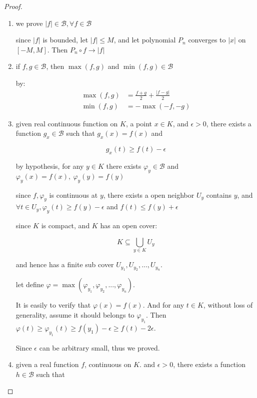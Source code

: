 \begin{proof}
    \begin{enumerate}
        \item we prove $|f| \in \mathscr{B}, \forall f \in \mathscr{B}$

        since $|f|$ is bounded, let $|f| \le M$, and let polynomial $P_n$ converges to 
        $|x|$ on $[-M, M]$. Then $P_n \circ f \to |f|$ 

        \item if $f,g \in \mathscr{B}$, then $\max(f,g)$ and $\min(f,g) \in \mathscr{B}$

        by:
        \begin{align*}
            \max(f,g) &= \frac{f+g}{2} + \frac{\left| f-g \right|}{2} \\
            \min(f,g) &= - \max(-f, -g)
        \end{align*}

        \item given real continuous function on $K$, a point $x \in K$, and $\epsilon > 0$, 
        there exists a function $g_x \in \mathscr{B}$ such that $g_x(x) = f(x)$ and 

        \[
            g_x(t) \ge f(t) - \epsilon
        \]

        by hypothesis, for any $y \in K$ there exists $\varphi_y \in \mathscr{B}$ and $\varphi_y(x) = f(x),\: \varphi_y(y) = f(y)$

        since $f, \varphi_y$ is continuous at $y$, there exists a open neighbor $U_y$ contains $y$, and $\forall t \in U_y, \varphi_y(t) \ge f(y) - \epsilon$ and
        $f(t) \le f(y) + \epsilon$

        since $K$ is compact, and $K$ has an open cover:

        \[
            K \subseteq \bigcup_{y \in K} U_y
        \]

        and hence has a finite sub cover $U_{y_1}, U_{y_2}, ..., U_{y_n}$. 

        let define $\varphi = \max(\varphi_{y_1}, \varphi_{y_2}, ..., \varphi_{y_n})$. 

        It is easily to verify that $\varphi(x) = f(x)$. And for any $t \in K$, without loss of generality, assume it should belongs to $\varphi_{y_1}$.
        Then $\varphi(t) \ge \varphi_{y_1}(t) \ge f(y_1) - \epsilon \ge f(t) - 2\epsilon$.

        Since $\epsilon$ can be arbitrary small, thus we proved.

        \item given a real function $f$, continuous on $K$. and $\epsilon > 0$, 
        there exists a function $h \in \mathscr{B}$ such that


\end{enumerate}
\end{proof}
